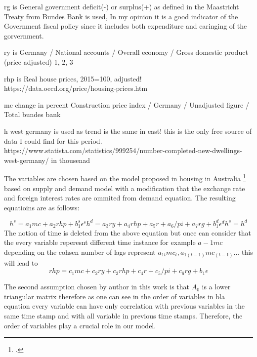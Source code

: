 rg is
General government deficit(-) or surplus(+) as defined in the Maastricht Treaty from  Bundes Bank is used, In my opinion it is a good indicator of the Government fiscal policy since it includes both expenditure and earinging of the gorvernment.

ry is
Germany / National accounts / Overall economy / Gross domestic product (price adjusted) 1, 2, 3

rhp is 
Real house prices, 2015=100, adjusted! https://data.oecd.org/price/housing-prices.htm

mc 
change in percent Construction price index / Germany / Unadjusted figure / Total  bundes bank

h
west germany is used as trend is the same in east! this is the only free source of data I could find for this period.
 https://www.statista.com/statistics/999254/number-completed-new-dwellings-west-germany/ in thousenad

The variables are chosen based on the model proposed in housing in Australia \footcite[See.][]{Wadud2009} based on supply and demand model with a modification that the exchange rate and foreign interest rates are ommited from demand equation. The resulting equatioins are as follows:

\[ 
h^s = a_1 mc + a_2 rhp + b_1^s \epsilon^s
h^d = a_3 ry + a_4 rhp + a_5 r + a_6 /pi + a_7 rg  + b_1^d \epsilon^d
h^s = h^d
\]
The notion of time is deleted from the above equation but once can consider that the every variable reperesnt different time instance for example $a-1 mc$ depending on the cohsen number of lags represent $a_{1t} mc_{t} ,  a_{1(t-1)} mc_{(t-1)} ...  $
this will lead to 
\[
 rhp  = c_1 mc+  c_2 ry + c_3 rhp  + c_4 r + c_5 /pi + c_6 rg  + b_1 \epsilon
\]

The second assumption chosen by author in this work is that $A_0$ is a lower triangular matrix therefore as one can see in the order of variables in bla equation every variable can have only correlation with previous variables in the same time stamp and with all variable in previous time stamps. Therefore, the order of variables play a crucial role in our model. 




